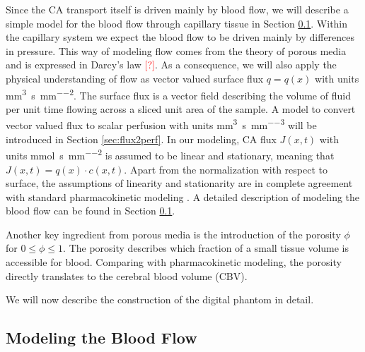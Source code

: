 \documentclass[paper=a4, fontsize=11pt,parskip=half,headings=small]{scrartcl}
\newcommand{\siq}{\cubic\milli\meter\per\second\per\square\milli\meter}
\newcommand{\siP}{\cubic\milli\meter\per\second\per\cubic\milli\meter}
\newcommand{\siJ}{\milli\mol\per\second\per\square\milli\meter}
\newcommand{\missingsource}{\textcolor{red}{[?]}}
\begin{document}
	Since the CA transport itself is driven mainly by blood flow, we will describe a simple model for the blood flow through capillary tissue in Section \ref{sec:flow}.
	Within the capillary system we expect the blood flow to be driven mainly by differences in pressure.
	This way of modeling flow comes from the theory of porous media and is expressed in Darcy's law \missingsource.
	As a consequence, we will also apply the physical understanding of flow as vector valued surface flux $q = q(x)$ with units \si{\siq}.
	The surface flux is a vector field describing the volume of fluid per unit time flowing across a sliced unit area of the sample.	
	A model to convert vector valued flux to scalar perfusion with units \si{\siP} will be introduced in Section \ref{sec:flux2perf}.
	In our modeling, CA flux $J(x,t)$ with units \si{\siJ} is assumed to be linear and stationary, meaning that $J(x,t) = q(x)\cdot c(x,t)$.
	Apart from the normalization with respect to surface, the assumptions of linearity and stationarity are in complete agreement with standard pharmacokinetic modeling \cite{sourbron13}.
	A detailed description of modeling the blood flow can be found in Section \ref{sec:flow}.
	
	Another key ingredient from porous media is the introduction of the porosity $\phi$ for $0 \le \phi \le 1$.
	The porosity describes which fraction of a small tissue volume is accessible for blood.
	Comparing with pharmacokinetic modeling, the porosity directly translates to the cerebral blood volume (CBV).
	
	We will now describe the construction of the digital phantom in detail.	
	
	\subsection{Modeling the Blood Flow}\label{sec:flow}
	
\end{document}
